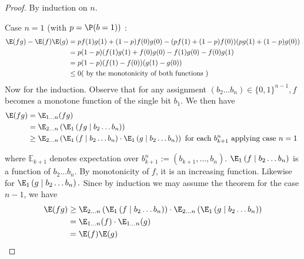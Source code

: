 \documentclass{article}
\begin{document}
\begin{proof}
By induction on $n .$ 

Case $n=1$ (with $p=\P(b=1))$ :
$$
\begin{aligned}
\E(f g)-\E(f) \E(g) &=p f(1) g(1)+(1-p) f(0) g(0)-(p f(1)+(1-p) f(0))(p g(1)+(1-p) g(0)) \\
&=p(1-p)(f(1) g(1)+f(0) g(0)-f(1) g(0)-f(0) g(1)\\
&=p(1-p)(f(1)-f(0))(g(1)-g(0))\\
&\le 0 (\text{ by the monotonicity of both functions })
\end{aligned}
$$
Now for the induction. Observe that for any assignment $\left(b_{2} \ldots b_{n}\right) \in\{0,1\}^{n-1}, f$ becomes a monotone function of the single bit $b_{1}$.  We then have
\begin{align*}
\E(f g) &=\E_{1 \ldots n}(f g) \\
&=\E_{2 \ldots n}\left(\E_{1}\left(f g \mid b_{2} \ldots b_{n}\right)\right)\\
&\geq \E_{2 \ldots n}\left(\E_{1}\left(f \mid b_{2} \ldots b_{n}\right) \cdot \E_{1}\left(g \mid b_{2} \ldots b_{n}\right)\right) \text{ for each $b_{k+1}^{n}$ applying case $n=1$ }
\end{align*}

where $\mathbb{E}_{k+1}$ denotes expectation over $b_{k+1}^{n}:=\left(b_{k+1}, \ldots, b_{n}\right)$. $\E_{1}\left(f \mid b_{2} \ldots b_{n}\right)$ is a function of $b_{2} \ldots b_{n}$. By monotonicity of $f$, it is an increasing function. Likewise for $\E_{1}\left(g \mid b_{2} \ldots b_{n}\right) .$ Since by induction we may assume the theorem for the case $n-1$, we have
\begin{align*}
\E(fg)& \geq \E_{2 \ldots n}\left(\E_{1}\left(f \mid b_{2} \ldots b_{n}\right)\right) \cdot \E_{2 \ldots n}\left(\E_{1}\left(g \mid b_{2} \ldots b_{n}\right)\right) \\
&=\E_{1 \ldots n}(f) \cdot \E_{1 \ldots n}(g) \\
&=\E(f) \E(g)
\end{align*}
\end{proof} 
\end{document}
